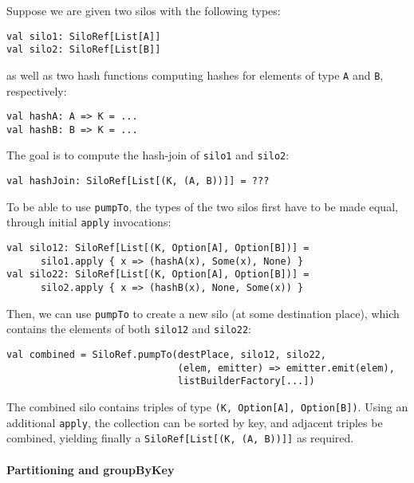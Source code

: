 \documentclass{easychair}
\begin{document}
Suppose we are given two silos with the following types:
\begin{verbatim}
val silo1: SiloRef[List[A]]
val silo2: SiloRef[List[B]]
\end{verbatim}
\noindent
as well as two hash functions computing hashes for elements of type \verb|A| and \verb|B|, respectively:
\begin{verbatim}
val hashA: A => K = ...
val hashB: B => K = ...
\end{verbatim}
\noindent
The goal is to compute the hash-join of \verb|silo1| and \verb|silo2|:
\begin{verbatim}
val hashJoin: SiloRef[List[(K, (A, B))]] = ???
\end{verbatim}
\noindent
To be able to use \verb|pumpTo|, the types of the two silos first have to be made equal, through initial \verb|apply| invocations:
\begin{verbatim}
val silo12: SiloRef[List[(K, Option[A], Option[B])] =
      silo1.apply { x => (hashA(x), Some(x), None) }
val silo22: SiloRef[List[(K, Option[A], Option[B])] =
      silo2.apply { x => (hashB(x), None, Some(x)) }
\end{verbatim}
\noindent
Then, we can use \verb|pumpTo| to create a new silo (at some destination place), which contains the elements of both \verb|silo12| and \verb|silo22|:
\begin{verbatim}
val combined = SiloRef.pumpTo(destPlace, silo12, silo22,
                              (elem, emitter) => emitter.emit(elem),
                              listBuilderFactory[...])
\end{verbatim}
\noindent
The combined silo contains triples of type \verb|(K, Option[A], Option[B])|. Using an
additional \verb|apply|, the collection can be sorted by key, and adjacent triples be
combined, yielding finally a \verb|SiloRef[List[(K, (A, B))]]| as required.

\paragraph{Partitioning and groupByKey}
\end{document}
